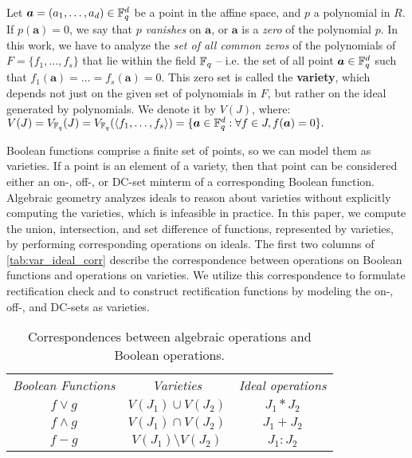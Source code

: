 Let $\bm{a} = (a_1,\dots,a_d) \in {\mathbb{F}}_{q}^d$ be a point in the affine
space, and $p$ a polynomial in $R$. If $p(\bm{a}) = 0$, we say
that $p$ {\it vanishes} on $\bm{a}$, or $\bm{a}$ is a {\it zero} of the polynomial $p$.
 In this work, we have to analyze
the {\it set of all common zeros} of the polynomials of $F = 
\{f_1,\dots,f_s\}$  that lie within the field ${\mathbb{F}}_{q}$ -- i.e. the set of
all point $\bm{a} \in {\mathbb{F}}_{q}^d$ such that
$f_1(\bm{a})=\dots=f_s(\bm{a})=0$. This zero set is called the {\bf
  variety}, which depends not just on the given set of polynomials in
$F$, but rather on the ideal generated by polynomials. We denote it by
$V(J)$, where: $ V(J)= V_{{\mathbb{F}}_{q}}(J) = V_{{\mathbb{F}}_{q}}(\langle f_1,\dots,f_s \rangle) = \{\bm{a} 
\in {\mathbb{F}}_{q}^d: \forall f \in J, f(\bm{a}) = 0\}.$

Boolean functions comprise a finite set of points, so we can model them as varieties. If a point is an element of a variety, then that point can be considered either an on-, off-, or DC-set minterm of a corresponding Boolean function. 
Algebraic geometry analyzes ideals to reason about varieties without explicitly computing the varieties, which is infeasible in practice.
In this paper, we compute the union, intersection, and set difference of functions, represented by varieties, by performing corresponding operations on ideals. 
The first two columns of \autoref{tab:var_ideal_corr} describe the correspondence between operations on Boolean functions and operations on varieties. We utilize this correspondence to formulate rectification check and to construct rectification functions by modeling the on-, off-, and DC-sets as varieties. 


\def\arraystretch{2}
\begin{table}[hbt!]
  \centering
  {\scriptsize
  \caption{Correspondences between algebraic operations and Boolean operations. 
  }\label{tab:var_ideal_corr}
  \begin{tabular} 
    {!{\vrule width 1pt} c !{\vrule width 1pt} c !{\vrule width 1pt} c !{\vrule width 1pt}}  
    {\it {Boolean Functions}} & {\it{Varieties}} & {\it{Ideal operations}} \\                                   
    $f \lor g$              & $V(J_1) \cup V(J_2)$            & $J_1 * J_2$           \\ \hline
    $f \land g$              & $V(J_1) \cap V(J_2)$            & $J_1 + J_2$               \\ \hline
    $f - g$                 & $V(J_1) \setminus V(J_2)$       & $J_1 : J_2$               \\ \hline
  \end{tabular}}
\end{table}

